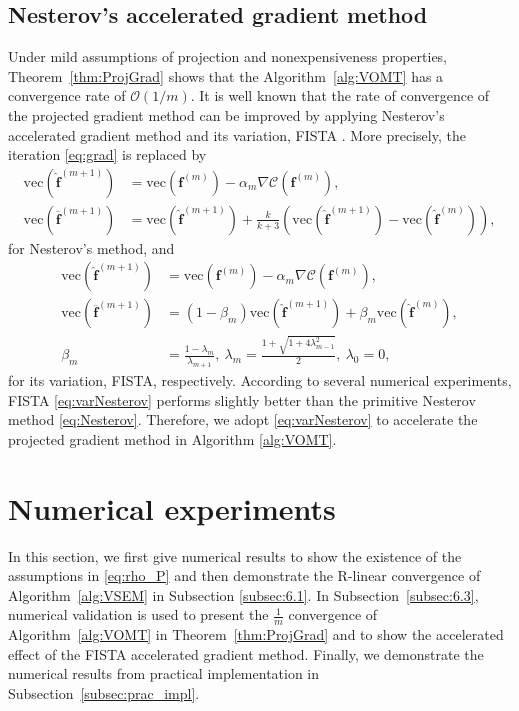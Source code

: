\documentclass[onefignum,onetabnum]{siamonline220329}
\numberwithin{equation}{section}
\def\vec{{\mathrm{vec}}}
\def\f{\mathbf{f}}
\begin{document}
\begin{sloppypar}
\subsection{Nesterov's accelerated gradient method}
Under mild assumptions of projection and nonexpensiveness properties, Theorem~\ref{thm:ProjGrad} shows that the Algorithm~\ref{alg:VOMT} has a convergence rate of $\mathcal{O}(1/m)$.
It is well known that the rate of convergence of the projected gradient method can be improved by applying Nesterov's accelerated gradient method \cite{nesterov1983} and its variation, FISTA \cite{BeTe09}. More precisely, the iteration \eqref{eq:grad} is replaced by
\begin{align}
\vec(\widehat{\f}^{(m+1)}) &= \vec(\f^{(m)}) - \alpha_m \nabla\mathcal{C}(\f^{(m)}), \nonumber \\
\vec(\overline{\f}^{(m+1)}) &= \vec(\widehat{\f}^{(m+1)}) + \frac{k}{k+3} \left(\vec(\widehat{\f}^{(m+1)}) - \vec(\widehat{\f}^{(m)}) \right), \label{eq:Nesterov}
\end{align}
for Nesterov's method, and
\begin{subequations} \label{eq:varNesterov}
\begin{align}
\vec(\widehat{\f}^{(m+1)}) &= \vec(\f^{(m)}) - \alpha_m \nabla\mathcal{C}(\f^{(m)}),   \\
\vec(\overline{\f}^{(m+1)}) &= (1-\beta_m) \vec(\widehat{\f}^{(m+1)}) + \beta_m \vec(\widehat{\f}^{(m)}), \\
\beta_m &= \frac{1-\lambda_m}{\lambda_{m+1}},~ \lambda_m = \frac{1+\sqrt{1+4\lambda_{m-1}^2}}{2},~ \lambda_0 = 0, 
\end{align}
\end{subequations}
for its variation, FISTA, respectively.
According to several numerical experiments, FISTA \eqref{eq:varNesterov} performs slightly better than the primitive Nesterov method \eqref{eq:Nesterov}. Therefore, we adopt \eqref{eq:varNesterov} to accelerate the projected gradient method in Algorithm \ref{alg:VOMT}.

\section{Numerical experiments}
\label{sec:6}

In this section, we first give numerical results to show the existence of the assumptions in \eqref{eq:rho_P} and then demonstrate the R-linear convergence of Algorithm~\ref{alg:VSEM} in Subsection \ref{subsec:6.1}. In Subsection~\ref{subsec:6.3}, numerical validation is used to present the $\frac{1}{m}$ convergence of Algorithm~\ref{alg:VOMT} in Theorem~\ref{thm:ProjGrad} and to show the accelerated effect of the FISTA accelerated gradient method. Finally, we demonstrate the numerical results from practical implementation in Subsection~\ref{subsec:prac_impl}.


\end{sloppypar}
\end{document}
